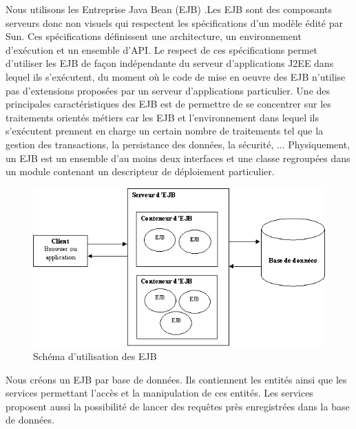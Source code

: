 Nous utilisons les Entreprise Java Bean (EJB) .Les EJB sont des composants serveurs donc non visuels qui respectent les spécifications d'un modèle édité par Sun. Ces spécifications définissent une architecture, un environnement d'exécution et un ensemble d'API. Le respect de ces spécifications permet d'utiliser les EJB de façon indépendante du serveur d'applications J2EE dans lequel ils s'exécutent, du moment où le code de mise en oeuvre des EJB n'utilise pas d'extensions proposées par un serveur d'applications particulier. Une des principales caractéristiques des EJB est de permettre de se concentrer sur les traitements orientés métiers car les EJB et l'environnement dans lequel ils s'exécutent prennent en charge un certain nombre de traitements tel que la gestion des transactions, la persistance des données, la sécurité, ...
Physiquement, un EJB est un ensemble d'au moins deux interfaces et une classe regroupées dans un module contenant un descripteur de déploiement particulier.\\
\begin{figure}[position]
   \caption{Schéma d'utilisation des EJB}
	\includegraphics[scale=1]{ejb001.gif} 
\end{figure}



Nous créons un EJB par base  de données. Ils contiennent les entités ainsi que les services permettant l'accès et la manipulation de ces entités. Les services proposent aussi la possibilité de lancer des requêtes près enregistrées dans la base de données.\\
